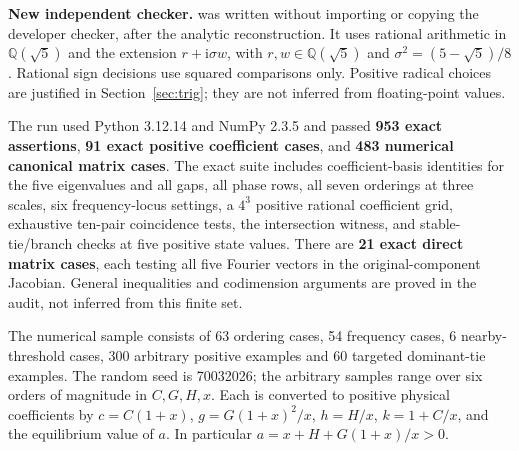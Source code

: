 \documentclass[11pt]{article}
\newcommand{\ii}{\mathrm{i}}
\begin{document}
\textbf{New independent checker.}
 was written without importing or
copying the developer checker, after the analytic reconstruction. It
uses rational arithmetic in $\mathbb Q(\sqrt5)$ and the extension
$r+\ii\sigma w$, with $r,w\in\mathbb Q(\sqrt5)$ and
$\sigma^2=(5-\sqrt5)/8$. Rational sign decisions use squared
comparisons only. Positive radical choices are justified in
Section~\ref{sec:trig}; they are not inferred from floating-point values.

The run used Python 3.12.14 and NumPy 2.3.5 and passed
\textbf{953 exact assertions}, \textbf{91 exact positive coefficient
cases}, and \textbf{483 numerical canonical matrix cases}. The exact
suite includes coefficient-basis identities for the five eigenvalues
and all gaps, all phase rows, all seven orderings at three scales,
six frequency-locus settings, a $4^3$ positive rational coefficient
grid, exhaustive ten-pair coincidence tests, the intersection witness,
and stable-tie/branch checks at five positive state values. There are
\textbf{21 exact direct matrix cases}, each testing all five Fourier
vectors in the original-component Jacobian. General inequalities and
codimension arguments are proved in the audit, not inferred from this
finite set.

The numerical sample consists of 63 ordering cases, 54 frequency cases,
6 nearby-threshold cases, 300 arbitrary positive examples and 60 targeted
dominant-tie examples. The random seed is 70032026; the arbitrary samples
range over six orders of magnitude in $C,G,H,x$. Each is converted to
positive physical coefficients by
$c=C(1+x)$, $g=G(1+x)^2/x$, $h=H/x$, $k=1+C/x$, and the
equilibrium value of $a$. In particular
$a=x+H+G(1+x)/x>0$.
\end{document}
